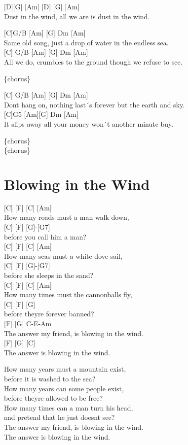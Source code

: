 \documentclass[
  letterpaper,
]{scrbook}
\begin{document}
{[}D{]}{[}G{]} {[}Am{]} {[}D{]} {[}G{]} {[}Am{]}\\
Dust in the wind, all we are is dust in the wind.

{[}C{]}G/B {[}Am{]} {[}G{]} Dm {[}Am{]}\\
Same old song, just a drop of water in the endless sea.\\
{[}C{]} G/B {[}Am{]} {[}G{]} Dm {[}Am{]}\\
All we do, crumbles to the ground though we refuse to see.

\{chorus\}

{[}C{]} G/B {[}Am{]} {[}G{]} Dm {[}Am{]}\\
Don\textquotesingle t hang on, nothing last´s forever but the earth and
sky.\\
{[}C{]}G5 {[}Am{]}{[}G{]} Dm {[}Am{]}\\
It slips away all your money won´t another minute buy.

\{chorus\}\\
\{chorus\}

\hypertarget{blowing-in-the-wind}{%
\chapter{Blowing in the Wind}\label{blowing-in-the-wind}}

{[}C{]} {[}F{]} {[}C{]} {[}Am{]}\\
How many roads must a man walk down,\\
{[}C{]} {[}F{]} {[}G{]}-{[}G7{]}\\
before you call him a man?\\
{[}C{]} {[}F{]} {[}C{]} {[}Am{]}\\
How many seas must a white dove sail,\\
{[}C{]} {[}F{]} {[}G{]}-{[}G7{]}\\
before she sleeps in the sand?\\
{[}C{]} {[}F{]} {[}C{]} {[}Am{]}\\
How many times must the cannonballs fly,\\
{[}C{]} {[}F{]} {[}G{]}\\
before they\textquotesingle re forever banned?\\
{[}F{]} {[}G{]} C-E-Am\\
The answer my friend, is blowing in the wind.\\
{[}F{]} {[}G{]} {[}C{]}\\
The answer is blowing in the wind.

How many years must a mountain exist,\\
before it is washed to the sea?\\
How many years can some people exist,\\
before they\textquotesingle re allowed to be free?\\
How many times can a man turn his head,\\
and pretend that he just doesn\textquotesingle t see?\\
The answer my friend, is blowing in the wind.\\
The answer is blowing in the wind.
\end{document}
